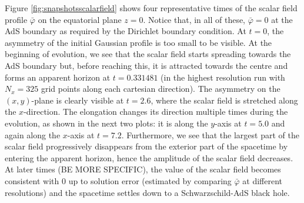 \documentclass[a4paper,11pt]{article}
\begin{document}
Figure \ref{fig:snapshotsscalarfield} shows four representative times of the scalar field profile $\bar{\varphi}$ on the equatorial plane $z=0$. Notice that, in all of these, $\bar{\varphi}=0$ at the AdS boundary as required by the Dirichlet boundary condition. At $t=0$, the asymmetry of the initial Gaussian profile is too small to be visible. At the beginning of evolution, we see that the scalar field starts spreading towards the AdS boundary but, before reaching this, it is attracted towards the centre and forms an apparent horizon at $t=0.331481$ (in the highest resolution run with $N_x=325$ grid points along each cartesian direction). 
The asymmetry on the $(x,y)$-plane is clearly visible at $t=2.6$, where the scalar field is stretched along the $x$-direction. The elongation changes its direction multiple times during the evolution, as shown in the next two plots: it is along the $y$-axis at $t=5.0$ and again along the $x$-axis at $t=7.2$. Furthermore, we see that the largest part of the scalar field progressively disappears from the exterior part of the spacetime by entering the apparent horizon, hence the amplitude of the scalar field decreases. At later times (BE MORE SPECIFIC), the value of the scalar field becomes consistent with 0 up to solution error (estimated by comparing $\bar{\varphi}$ at different resolutions) and the spacetime settles down to a Schwarzschild-AdS black hole.
\end{document}
